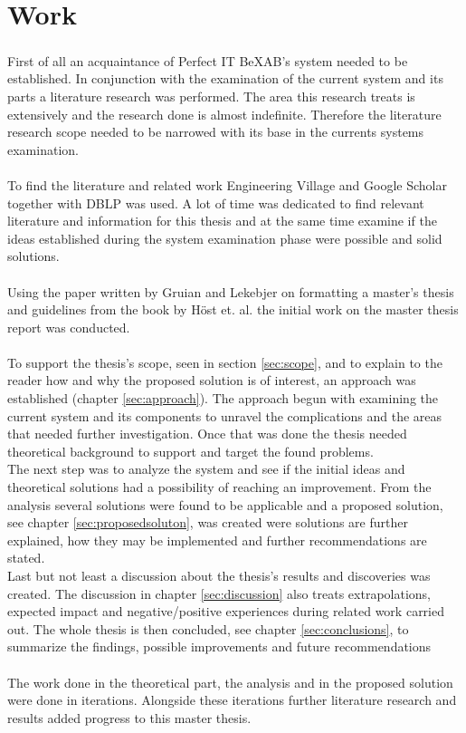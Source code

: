 \documentclass{cslthse-msc}
\newcommand{\bex}{BeX\textsuperscript{\textregistered}}
\begin{document}
\section{Work}
First of all an acquaintance of Perfect IT \bex AB's system needed to be established. In conjunction with the examination of the current system and its parts a literature research was performed. The area this research treats is extensively and the research done is almost indefinite. Therefore the literature research scope needed to be narrowed with its base in the currents systems examination.\\\\    
To find the literature and related work Engineering Village   \cite{Enginvillage} and Google Scholar   \cite{Googlescholar} together with DBLP   \cite{DBLP} was used. A lot of time was dedicated to find relevant literature and information for this thesis and at the same time examine if the ideas established during the system examination phase were possible and solid solutions.\\\\
Using the paper written by Gruian and Lekebjer on formatting a master’s thesis   \cite{Reportmall} and guidelines from the book by Höst et. al.    \cite{regnell} the initial work on the master thesis report was conducted.\\\\ 
To support the thesis's scope, seen in section \ref{sec:scope}, and to explain to the reader how and why the proposed solution is of interest, an approach was established (chapter \ref{sec:approach}). The approach begun with examining the current system and its components to unravel the complications and the areas that needed further investigation. Once that was done the thesis needed theoretical background to support and target the found problems.\\
The next step was to analyze the system and see if the initial ideas and theoretical solutions had a possibility of reaching an improvement.
From the analysis several solutions were found to be applicable and a proposed solution, see chapter \ref{sec:proposedsoluton}, was created were solutions are further explained, how they may be implemented and further recommendations are stated.\\
Last but not least a discussion about the thesis's results and discoveries was created. The discussion in chapter \ref{sec:discussion} also treats extrapolations, expected impact and negative/positive experiences during related work carried out.
The whole thesis is then concluded, see chapter \ref{sec:conclusions}, to summarize the findings, possible improvements and future recommendations\\\\
The work done in the theoretical part, the analysis and in the proposed solution were done in iterations. Alongside these iterations further literature research and results added progress to this master thesis.         
\end{document}
